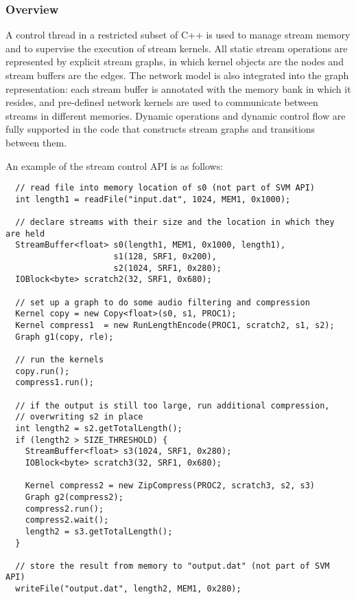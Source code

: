 \subsubsection{Overview}
\label{sec:streamover}

A control thread in a restricted subset of C++ is used to manage
stream memory and to supervise the execution of stream kernels.  All
static stream operations are represented by explicit stream graphs, in
which kernel objects are the nodes and stream buffers are the edges.
The network model is also integrated into the graph representation:
each stream buffer is annotated with the memory bank in which it
resides, and pre-defined network kernels are used to communicate
between streams in different memories.  Dynamic operations and dynamic
control flow are fully supported in the code that constructs stream
graphs and transitions between them.

An example of the stream control API is as follows:
{\small
\begin{verbatim}
  // read file into memory location of s0 (not part of SVM API)
  int length1 = readFile("input.dat", 1024, MEM1, 0x1000);

  // declare streams with their size and the location in which they are held
  StreamBuffer<float> s0(length1, MEM1, 0x1000, length1), 
                      s1(128, SRF1, 0x200), 
                      s2(1024, SRF1, 0x280);
  IOBlock<byte> scratch2(32, SRF1, 0x680);

  // set up a graph to do some audio filtering and compression
  Kernel copy = new Copy<float>(s0, s1, PROC1);
  Kernel compress1  = new RunLengthEncode(PROC1, scratch2, s1, s2);
  Graph g1(copy, rle);

  // run the kernels
  copy.run();
  compress1.run();

  // if the output is still too large, run additional compression, 
  // overwriting s2 in place
  int length2 = s2.getTotalLength();
  if (length2 > SIZE_THRESHOLD) {
    StreamBuffer<float> s3(1024, SRF1, 0x280);
    IOBlock<byte> scratch3(32, SRF1, 0x680);
    
    Kernel compress2 = new ZipCompress(PROC2, scratch3, s2, s3)
    Graph g2(compress2);
    compress2.run();
    compress2.wait();
    length2 = s3.getTotalLength();
  }

  // store the result from memory to "output.dat" (not part of SVM API)
  writeFile("output.dat", length2, MEM1, 0x280);
\end{verbatim}}

